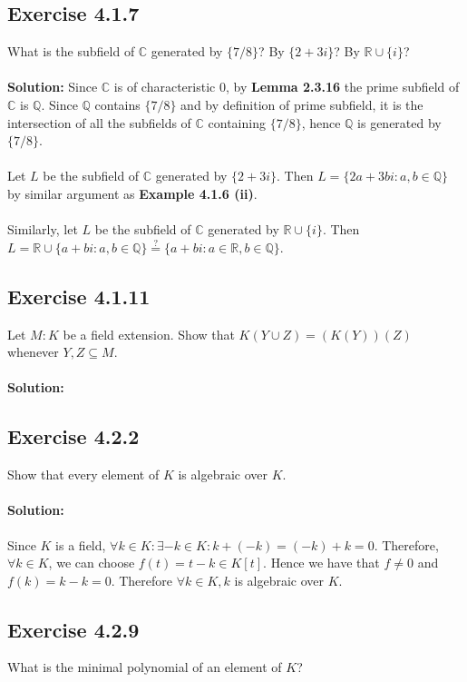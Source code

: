 \documentclass{article}
\begin{document}
\subsection*{Exercise 4.1.7}
What is the subfield of $\mathbb{C}$ generated by $\{7/8\}$? By $\{2+3i\}$? By $\mathbb{R}\cup\{i\}$?
\\\\
\textbf{Solution:}
Since $\mathbb{C}$ is of characteristic $0$, by \textbf{Lemma 2.3.16} the prime subfield of $\mathbb{C}$ is $\mathbb{Q}$.
Since $\mathbb{Q}$ contains $\{7/8\}$ and by definition of prime subfield, it is the intersection of all the subfields of $\mathbb{C}$ containing $\{7/8\}$, 
hence $\mathbb{Q}$ is generated by $\{7/8\}$.\\\\
Let $L$ be the subfield of $\mathbb{C}$ generated by $\{2+3i\}$. Then $L = \{2a+3bi: a,b \in \mathbb{Q}\}$ by similar argument as \textbf{Example 4.1.6 (ii)}.\\\\
Similarly, let $L$ be the subfield of $\mathbb{C}$ generated by $ \mathbb{R}\cup\{i\}$. Then \\ $L=\mathbb{R} \cup \{a+bi: a,b \in \mathbb{Q}\} \stackrel{?}{=} \{a+bi: a \in \mathbb{R}, b \in \mathbb{Q}\}$.

\subsection*{Exercise 4.1.11}
Let $M:K$ be a field extension. Show that $K(Y \cup Z) = (K(Y))(Z)$ whenever $Y,Z \subseteq M$. 
\\\\
\textbf{Solution:}

\subsection*{Exercise 4.2.2}
Show that every element of $K$ is algebraic over $K$.
\paragraph{Solution:}
Since $K$ is a field, $\forall k \in K: \exists -k \in K: k + (-k) = (-k) + k = 0$.
Therefore, $\forall k \in K$, we can choose $f(t) = t - k \in K[t]$. Hence we have that $f \neq 0$
and $f(k) = k - k = 0$. Therefore $\forall k \in K, k$ is algebraic over $K$.


\subsection*{Exercise 4.2.9}
What is the minimal polynomial of an element of $K$?
\end{document}
